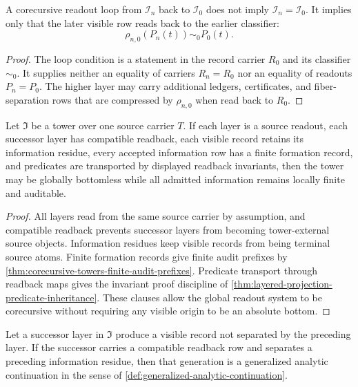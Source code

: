 \begin{theorem}
\label{thm:readout-loops-not-layer-equalities}
A corecursive readout loop from $\mathcal I_n$ back to
$\mathcal I_0$ does not imply $\mathcal I_n=\mathcal I_0$. It implies
only that the later visible row reads back to the earlier classifier:
$$
\rho_{n,0}(P_n(t))\sim_0 P_0(t).
$$
\end{theorem}

\begin{proof}
The loop condition is a statement in the record carrier $R_0$ and its
classifier $\sim_0$. It supplies neither an equality of carriers
$R_n=R_0$ nor an equality of readouts $P_n=P_0$. The higher layer may
carry additional ledgers, certificates, and fiber-separation rows that
are compressed by $\rho_{n,0}$ when read back to $R_0$.
\end{proof}

\begin{theorem}
\label{thm:bottomless-corecursive-tower-principle}
Let $\mathfrak I$ be a tower over one source carrier $T$. If each layer
is a source readout, each successor layer has compatible readback, each
visible record retains its information residue, every accepted
information row has a finite formation record, and predicates are
transported by displayed readback invariants, then the tower may be
globally bottomless while all admitted information remains locally
finite and auditable.
\end{theorem}

\begin{proof}
All layers read from the same source carrier by assumption, and
compatible readback prevents successor layers from becoming
tower-external source objects. Information residues keep visible records
from being terminal source atoms. Finite formation records give finite
audit prefixes by
\autoref{thm:corecursive-towers-finite-audit-prefixes}. Predicate
transport through readback maps gives the invariant proof discipline of
\autoref{thm:layered-projection-predicate-inheritance}. These clauses
allow the global readout system to be corecursive without requiring any
visible origin to be an absolute bottom.
\end{proof}

\begin{theorem}
\label{thm:lawful-nontrivial-generation-generalized-extension}
Let a successor layer in $\mathfrak I$ produce a visible record not
separated by the preceding layer. If the successor carries a compatible
readback row and separates a preceding information residue, then that
generation is a generalized analytic continuation in the sense of
\autoref{def:generalized-analytic-continuation}.
\end{theorem}

